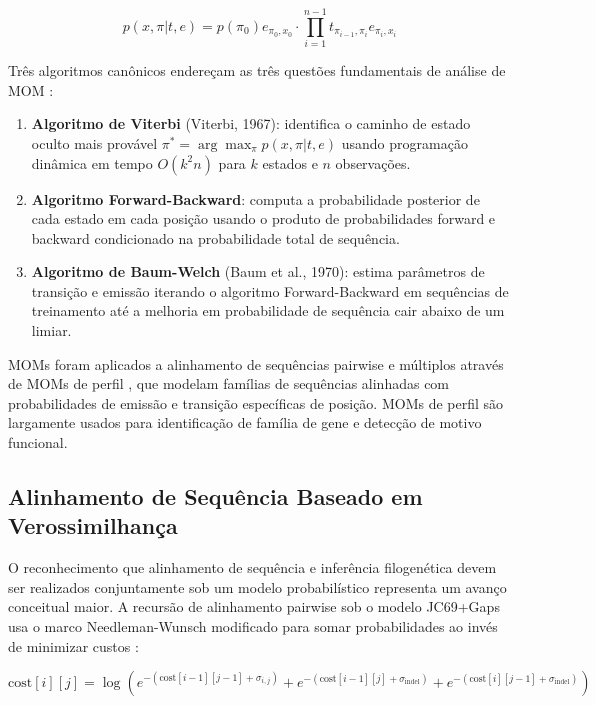 $$p(x, \pi|t, e) = p(\pi_0) e_{\pi_0, x_0} \cdot \prod_{i=1}^{n-1} t_{\pi_{i-1}, \pi_i} e_{\pi_i, x_i}$$

Três algoritmos canônicos endereçam as três questões fundamentais de análise de MOM \parencite{wheeler2012}:

\begin{enumerate}
    \item \textbf{Algoritmo de Viterbi} (Viterbi, 1967): identifica o caminho de estado oculto mais provável $\pi^* = \arg\max_\pi p(x, \pi|t, e)$ usando programação dinâmica em tempo $O(k^2 n)$ para $k$ estados e $n$ observações.

    \item \textbf{Algoritmo Forward-Backward}: computa a probabilidade posterior de cada estado em cada posição usando o produto de probabilidades forward e backward condicionado na probabilidade total de sequência.

    \item \textbf{Algoritmo de Baum-Welch} (Baum et al., 1970): estima parâmetros de transição e emissão iterando o algoritmo Forward-Backward em sequências de treinamento até a melhoria em probabilidade de sequência cair abaixo de um limiar.
\end{enumerate}

MOMs foram aplicados a alinhamento de sequências pairwise e múltiplos através de MOMs de perfil \parencite{krogh1994}, que modelam famílias de sequências alinhadas com probabilidades de emissão e transição específicas de posição. MOMs de perfil são largamente usados para identificação de família de gene e detecção de motivo funcional.

\subsection{Alinhamento de Sequência Baseado em Verossimilhança}

O reconhecimento que alinhamento de sequência e inferência filogenética devem ser realizados conjuntamente sob um modelo probabilístico representa um avanço conceitual maior. A recursão de alinhamento pairwise sob o modelo JC69+Gaps usa o marco Needleman-Wunsch modificado para somar probabilidades ao invés de minimizar custos \parencite{wheeler2012}:

$$\mathrm{cost}[i][j] = \log\left( e^{-(\mathrm{cost}[i-1][j-1] + \sigma_{i,j})} + e^{-(\mathrm{cost}[i-1][j] + \sigma_{\mathrm{indel}})} + e^{-(\mathrm{cost}[i][j-1] + \sigma_{\mathrm{indel}})} \right)$$

